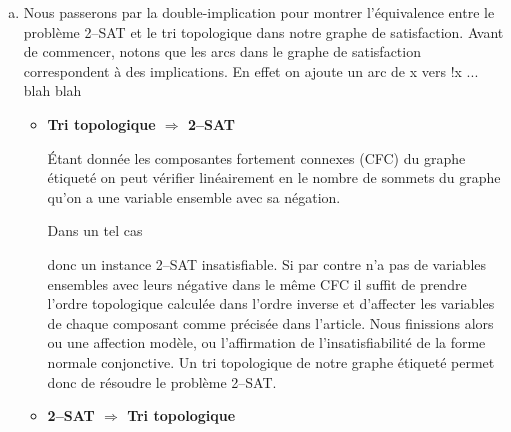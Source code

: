 \begin{enumerate}[(a)]
\item 

Nous passerons par la double-implication pour montrer l'équivalence entre le problème 2--SAT et le tri topologique dans notre graphe de satisfaction. Avant de commencer, notons que les arcs dans le graphe de satisfaction correspondent à des implications. En effet on ajoute un arc de x vers !x  ... blah blah

\begin{itemize}
\item \textbf{Tri topologique $\Rightarrow$ 2--SAT}


Étant donnée les composantes fortement connexes (CFC) du graphe étiqueté on peut vérifier linéairement en le nombre de sommets du graphe qu'on a une variable ensemble avec sa négation. 

Dans un tel cas 




 donc un instance 2--SAT insatisfiable. Si par contre n'a pas de variables ensembles avec leurs négative dans le même CFC il suffit de prendre l'ordre topologique calculée dans l'ordre inverse et d'affecter les variables de chaque composant comme précisée dans l'article.  
Nous finissions alors ou une affection modèle, ou l'affirmation de l'insatisfiabilité de la forme normale conjonctive. Un tri topologique de notre graphe étiqueté permet donc de résoudre le problème 2--SAT. 


\item \textbf{2--SAT $\Rightarrow$ Tri topologique}






\end{itemize}

\end{enumerate}



